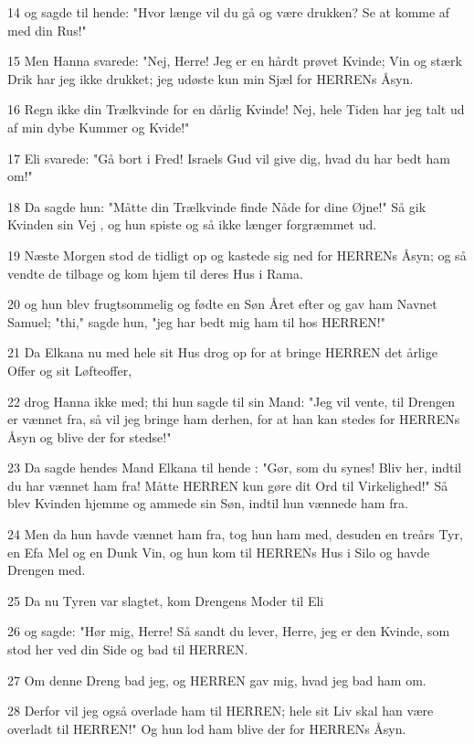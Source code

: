 \par 14 og sagde til hende: "Hvor længe vil du gå og være drukken? Se at komme af med din Rus!"
\par 15 Men Hanna svarede: "Nej, Herre! Jeg er en hårdt prøvet Kvinde; Vin og stærk Drik har jeg ikke drukket; jeg udøste kun min Sjæl for HERRENs Åsyn.
\par 16 Regn ikke din Trælkvinde for en dårlig Kvinde! Nej, hele Tiden har jeg talt ud af min dybe Kummer og Kvide!"
\par 17 Eli svarede: "Gå bort i Fred! Israels Gud vil give dig, hvad du har bedt ham om!"
\par 18 Da sagde hun: "Måtte din Trælkvinde finde Nåde for dine Øjne!" Så gik Kvinden sin Vej , og hun spiste og så ikke længer forgræmmet ud.
\par 19 Næste Morgen stod de tidligt op og kastede sig ned for HERRENs Åsyn; og så vendte de tilbage og kom hjem til deres Hus i Rama.
\par 20 og hun blev frugtsommelig og fødte en Søn Året efter og gav ham Navnet Samuel; "thi," sagde hun, "jeg har bedt mig ham til hos HERREN!"
\par 21 Da Elkana nu med hele sit Hus drog op for at bringe HERREN det årlige Offer og sit Løfteoffer,
\par 22 drog Hanna ikke med; thi hun sagde til sin Mand: "Jeg vil vente, til Drengen er vænnet fra, så vil jeg bringe ham derhen, for at han kan stedes for HERRENs Åsyn og blive der for stedse!"
\par 23 Da sagde hendes Mand Elkana til hende : "Gør, som du synes! Bliv her, indtil du har vænnet ham fra! Måtte HERREN kun gøre dit Ord til Virkelighed!" Så blev Kvinden hjemme og ammede sin Søn, indtil hun vænnede ham fra.
\par 24 Men da hun havde vænnet ham fra, tog hun ham med, desuden en treårs Tyr, en Efa Mel og en Dunk Vin, og hun kom til HERRENs Hus i Silo og havde Drengen med.
\par 25 Da nu Tyren var slagtet, kom Drengens Moder til Eli
\par 26 og sagde: "Hør mig, Herre! Så sandt du lever, Herre, jeg er den Kvinde, som stod her ved din Side og bad til HERREN.
\par 27 Om denne Dreng bad jeg, og HERREN gav mig, hvad jeg bad ham om.
\par 28 Derfor vil jeg også overlade ham til HERREN; hele sit Liv skal han være overladt til HERREN!" Og hun lod ham blive der for HERRENs Åsyn.

